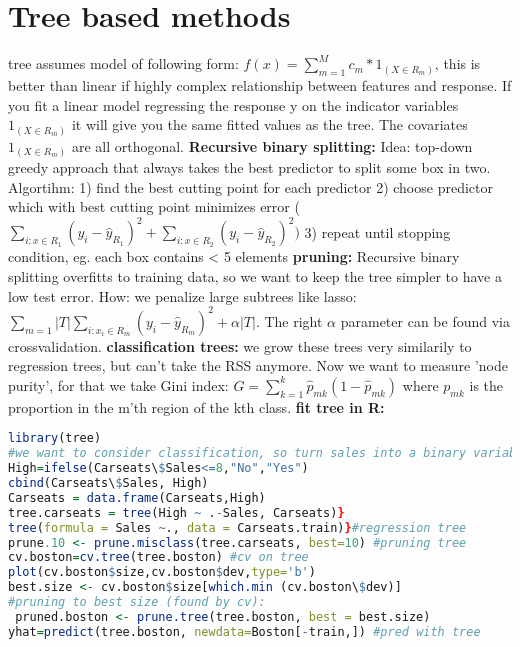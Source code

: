 \section{Tree based methods}
tree assumes model of following form: 
$f(x) = \sum_{m=1}^M c_m*1_{(X \in R_m)}$, this is better than linear if highly complex relationship between features and response. If you fit a linear model regressing the response y on the indicator variables $1_{(X \in R_m)}$ it will give you the same fitted values as the tree. The covariates $1_{(X \in R_m)}$ are all orthogonal.
\textbf{Recursive binary splitting: }
Idea: top-down greedy approach that always takes the best predictor to split some box in two. Algortihm:
1) find the best cutting point for each predictor
2) choose predictor which with best cutting point minimizes error ($\sum_{i:x \in R_1}(y_i-\hat y_{R_1})^2+\sum_{i:x \in R_2}(y_i-\hat y_{R_2})^2)$
3) repeat until stopping condition, eg. each box contains < 5 elements
\textbf{pruning: } Recursive binary splitting overfitts to training data, so we want to keep the tree simpler to have a low test error. How: we penalize large subtrees like lasso: $\sum_{m=1}{|T|}\sum_{i: x_i \in R_m}(y_i - \hat y_{R_m})^2 + \alpha|T|$. The right $\alpha$ parameter can be found via crossvalidation. 
\textbf{classification trees: } we grow these trees very similarily to regression trees, but can't take the RSS anymore. Now we want to measure 'node purity', for that we take Gini index: $G = \sum_{k=1}^k \hat p_{mk}(1-\hat p_{mk})$ where $p_{mk}$ is the proportion in the m'th region of the kth class.
\textbf{fit tree in R:}\begin{lstlisting}[language=R] library(tree)
#we want to consider classification, so turn sales into a binary variable
High=ifelse(Carseats\$Sales<=8,"No","Yes")
cbind(Carseats\$Sales, High)
Carseats = data.frame(Carseats,High)
tree.carseats = tree(High ~ .-Sales, Carseats)}
tree(formula = Sales ~., data = Carseats.train)}#regression tree
prune.10 <- prune.misclass(tree.carseats, best=10) #pruning tree
cv.boston=cv.tree(tree.boston) #cv on tree
plot(cv.boston$size,cv.boston$dev,type='b')
best.size <- cv.boston$size[which.min (cv.boston\$dev)]
#pruning to best size (found by cv): 
 pruned.boston <- prune.tree(tree.boston, best = best.size)
yhat=predict(tree.boston, newdata=Boston[-train,]) #pred with tree \end{lstlisting}